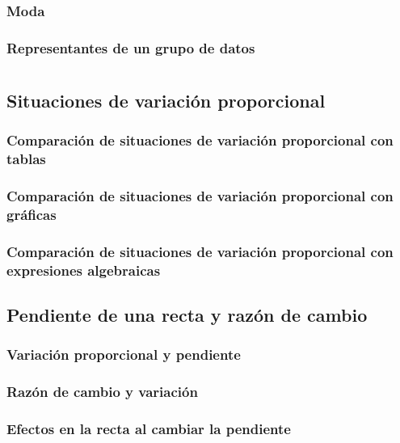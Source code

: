 \documentclass[11pt]{book}
\begin{document}
\subsection{Moda}
\subsection{Representantes de un grupo de datos}

\chapter{}

\section{Situaciones de variación proporcional}
\subsection{Comparación de situaciones de variación proporcional con tablas}
\subsection{Comparación de situaciones de variación proporcional con gráficas}
\subsection{Comparación de situaciones de variación proporcional con expresiones algebraicas}




\newpage \thispagestyle{plain}
\section{Pendiente de una recta y razón de cambio}
\subsection{Variación proporcional y pendiente}
\subsection{Razón de cambio y variación}
\subsection{Efectos en la recta al cambiar la pendiente}

\newpage \thispagestyle{plain}
\end{document}
